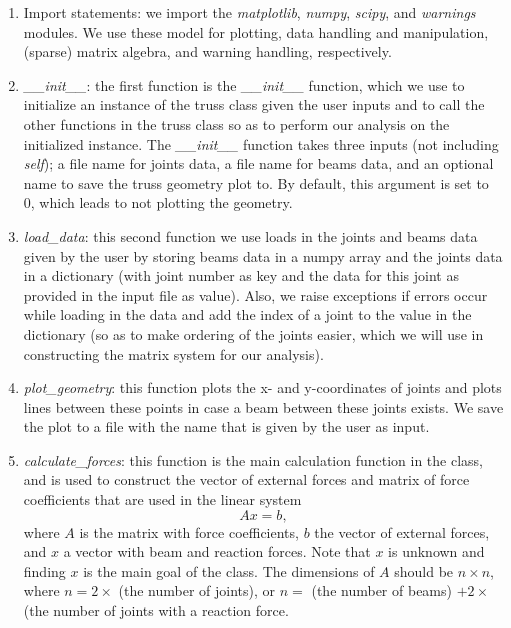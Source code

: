 \documentclass[12pt, a4paper]{article}
\begin{document}
\begin{enumerate}
    \item Import statements: we import the \textit{matplotlib}, \textit{numpy},
    \textit{scipy}, and \textit{warnings} modules. We use these model for 
    plotting, data handling and manipulation, (sparse) matrix algebra, and
    warning handling, respectively.
    
    \item \textit{\_\_init\_\_}: the first function is the 
    \textit{\_\_init\_\_} function, which we use to initialize 
    an instance of the truss class given the user inputs and to 
    call the other functions in the truss class so as to perform 
    our analysis on the initialized instance. The 
    \textit{\_\_init\_\_} function takes three inputs (not including
    \textit{self}); a file name for joints data, a file name for beams
    data, and an optional name to save the truss geometry plot to. By
    default, this argument is set to 0, which leads to not plotting the
    geometry.
    
    \item \textit{load\_data}: this second function we use loads in the
    joints and beams data given by the user by storing beams data in a
    numpy array and the joints data in a dictionary (with joint number
    as key and the data for this joint as provided in the input file
    as value). Also, we raise exceptions if errors occur while loading
    in the data and add the index of a joint to the value in the 
    dictionary (so as to make ordering of the joints easier, which
    we will use in constructing the matrix system for our analysis).
    
    \item \textit{plot\_geometry}: this function plots the x- and
    y-coordinates of joints and plots lines between these points
    in case a beam between these joints exists. We save the plot
    to a file with the name that is given by the user as input. 
    
    \item \textit{calculate\_forces}: this function is the main
    calculation function in the class, and is used to construct
    the vector of external forces and matrix of force coefficients
    that are used in the linear system 
    \begin{equation}
    \label{eq: linear-system}
        Ax = b,
    \end{equation}
    where $A$ is the matrix with force coefficients, $b$ the vector
    of external forces, and $x$ a vector with beam and reaction forces.
    Note that $x$ is unknown and finding $x$ is the main goal of the
    class. The dimensions of $A$ should be $n \times n$, where
    $n = 2 \times$ (the number of joints), or $n =$ (the number of
    beams) $+ 2 \times$ (the number of joints with a reaction force.
    

\end{enumerate}
\end{document}
